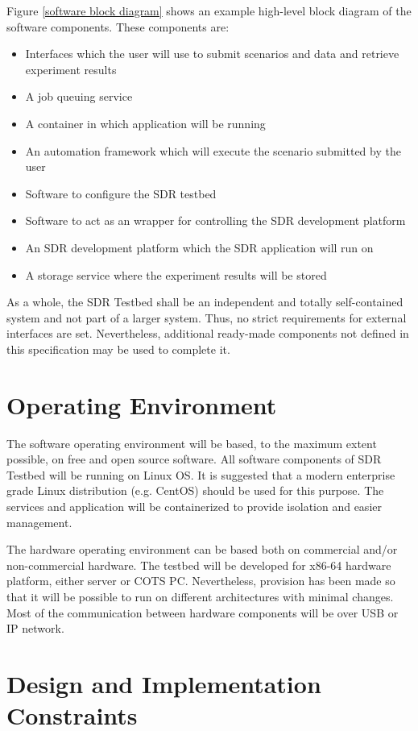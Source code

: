 \documentclass[english,titlepage,a4paper]{report}
\begin{document}
Figure \ref{software block diagram} shows an example high-level block diagram of the software components.
These components are:
\begin{itemize}
\item Interfaces which the user will use to submit scenarios and data and retrieve experiment results
\item A job queuing service
\item A container in which application will be running
\item An automation framework which will execute the scenario submitted by the user
\item Software to configure the SDR testbed
\item Software to act as an wrapper for controlling the SDR development platform
\item An SDR development platform which the SDR application will run on
\item A storage service where the experiment results will be stored
\end{itemize}

As a whole, the SDR Testbed shall be an independent and totally self-contained system and not part of a larger system.
Thus, no strict requirements for external interfaces are set.
Nevertheless, additional ready-made components not defined in this specification may be used to complete it.

\section{Operating Environment}

The software operating environment will be based, to the maximum extent possible, on free and open source software.
All software components of SDR Testbed will be running on Linux OS.
It is suggested that a modern enterprise grade Linux distribution (e.g. CentOS) should be used for this purpose.
The services and application will be containerized to provide isolation and easier management.

The hardware operating environment can be based both on commercial and/or non-commercial hardware.
The testbed will be developed for x86-64 hardware platform, either server or COTS PC.
Nevertheless, provision has been made so that it will be possible to run on different architectures with minimal changes.
Most of the communication between hardware components will be over USB or IP network.

\section{Design and Implementation Constraints}
\end{document}

